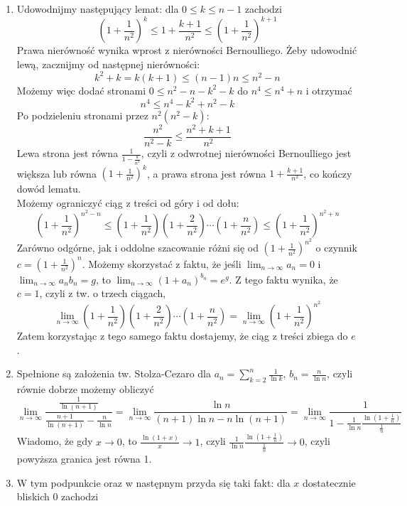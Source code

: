 \documentclass{../note}
\begin{document}
\begin{rozwiazanie}
\begin{enumerate}[label=(\alph*)]
    \item Udowodnijmy następujący lemat: dla $0 \leq k \leq n - 1$ zachodzi
    \[\left(1 + \frac{1}{n^2}\right)^k \leq 1 + \frac{k+1}{n^2} \leq \left(1 + \frac{1}{n^2}\right)^{k+1}\]
    Prawa nierówność wynika wprost z nierówności Bernoulliego. Żeby udowodnić lewą, zacznijmy od następnej nierówności:
    \[k^2 + k = k(k + 1) \leq (n - 1)n \leq n^2 - n\]
    Możemy więc dodać stronami $0 \leq n^2 - n - k^2 - k$ do $n^4 \leq n^4 + n$ i otrzymać
    \[n^4 \leq n^4 - k^2 + n^2 - k\]
    Po podzieleniu stronami przez $n^2(n^2 - k)$:
    \[\frac{n^2}{n^2 - k} \leq \frac{n^2 + k + 1}{n^2}\]
    Lewa strona jest równa $\frac{1}{1 - \frac{k}{n^2}}$, czyli z odwrotnej nierówności Bernoulliego jest większa lub równa $\left(1 + \frac{1}{n^2}\right)^k$, a prawa strona jest równa $1 + \frac{k + 1}{n^2}$, co kończy dowód lematu.\\
    Możemy ograniczyć ciąg z treści od góry i od dołu:
    \[\left(1 + \frac{1}{n^2}\right)^{n^2-n} \leq \left(1+\frac{1}{n^{2}}\right) \left(1+\frac{2}{n^{2}}\right) \cdots \left(1+\frac{n}{n^{2}}\right) \leq \left(1 + \frac{1}{n^2}\right)^{n^2+n}\]
    Zarówno odgórne, jak i oddolne szacowanie różni się od $\left(1 + \frac{1}{n^2}\right)^{n^2}$ o czynnik $c = \left(1 + \frac{1}{n^2}\right)^{n}$. Możemy skorzystać z faktu, że jeśli $\lim_{n\to\infty} a_n = 0$ i $\lim_{n\to\infty} a_nb_n = g$, to $\lim_{n\to\infty} \left(1 + a_n\right)^{b_n} = e^g$. Z tego faktu wynika, że $c = 1$, czyli z tw. o trzech ciągach,
    \[\lim_{n\to\infty} \left(1+\frac{1}{n^{2}}\right) \left(1+\frac{2}{n^{2}}\right) \cdots \left(1+\frac{n}{n^{2}}\right) = \lim_{n\to\infty} \left(1 + \frac{1}{n^2}\right)^{n^2}\]
    Zatem korzystając z tego samego faktu dostajemy, że ciąg z treści zbiega do $e$.
    \item Spełnione są założenia tw. Stolza-Cezaro dla $a_n = \sum_{k=2}^{n} \frac{1}{\ln k}$, $b_n = \frac{n}{\ln n}$, czyli równie dobrze możemy obliczyć
    \[\lim_{n\to\infty} \frac{\frac{1}{\ln(n + 1)}}{\frac{n + 1}{\ln(n + 1)} - \frac{n}{\ln n}} = \lim_{n\to\infty} \frac{\ln n}{(n + 1)\ln n - n\ln(n + 1)} = \lim_{n\to\infty} \frac{1}{1 - \frac{1}{\ln n} \frac{\ln(1+\frac1n)}{\frac1n}}\]
    Wiadomo, że gdy $x \to 0$, to $\frac{\ln(1 + x)}{x} \to 1$, czyli $\frac{1}{\ln n} \frac{\ln(1+\frac1n)}{\frac1n} \to 0$, czyli powyższa granica jest równa 1.
    \item W tym podpunkcie oraz w następnym przyda się taki fakt: dla $x$ dostatecznie bliskich $0$ zachodzi 

\end{enumerate}
\end{rozwiazanie}
\end{document}
